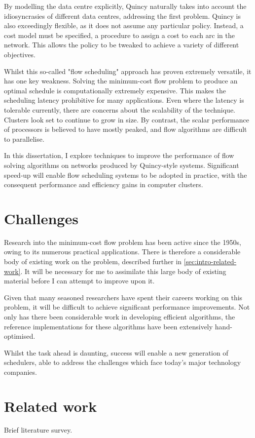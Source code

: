 By modelling the data centre explicitly, Quincy naturally takes into account the idiosyncrasies of different data centres, addressing the first problem. Quincy is also exceedingly flexible, as it does not assume any particular policy. Instead, a cost model must be specified, a procedure to assign a cost to each arc in the network. This allows the policy to be tweaked to achieve a variety of different objectives.

Whilst this so-called "flow scheduling" approach has proven extremely versatile, it has one key weakness. Solving the minimum-cost flow problem to produce an optimal schedule is computationally extremely expensive. This makes the scheduling latency prohibitive for many applications. Even where the latency is tolerable currently, there are concerns about the scalability of the technique. Clusters look set to continue to grow in size. By contrast, the scalar performance of processors is believed to have mostly peaked, and flow algorithms are difficult to parallelise.

In this dissertation, I explore techniques to improve the performance of flow solving algorithms on networks produced by Quincy-style systems. Significant speed-up will enable flow scheduling systems to be adopted in practice, with the consequent performance and efficiency gains in computer clusters.

\section{Challenges} \label{sec:intro-challenges}
Research into the minimum-cost flow problem has been active since the 1950s, owing to its numerous practical applications. There is therefore a considerable body of existing work on the problem, described further in \vref{sec:intro-related-work}. It will be necessary for me to assimilate this large body of existing material before I can attempt to improve upon it.

Given that many seasoned researchers have spent their careers working on this problem, it will be difficult to achieve significant performance improvements. Not only has there been considerable work in developing efficient algorithms, the reference implementations for these algorithms have been extensively hand-optimised.

Whilst the task ahead is daunting, success will enable a new generation of schedulers, able to address the challenges which face today's major technology companies.

\section{Related work} \label{sec:intro-related-work}
Brief literature survey.